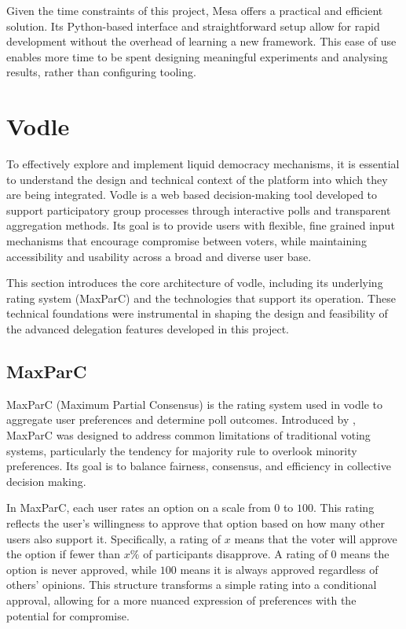 Given the time constraints of this project, Mesa offers a practical and efficient solution. Its Python-based interface and straightforward setup allow for rapid development without the overhead of learning a new framework. This ease of use enables more time to be spent designing meaningful experiments and analysing results, rather than configuring tooling.
\section{Vodle}
To effectively explore and implement liquid democracy mechanisms, it is essential to understand the design and technical context of the platform into which they are being integrated. Vodle is a web based decision-making tool developed to support participatory group processes through interactive polls and transparent aggregation methods. Its goal is to provide users with flexible, fine grained input mechanisms that encourage compromise between voters, while maintaining accessibility and usability across a broad and diverse user base.

This section introduces the core architecture of vodle, including its underlying rating system (MaxParC) and the technologies that support its operation. These technical foundations were instrumental in shaping the design and feasibility of the advanced delegation features developed in this project.


\subsection{MaxParC}\label{subsec:background_maxparc}
MaxParC (Maximum Partial Consensus) is the rating system used in vodle to aggregate user preferences and determine poll outcomes. Introduced by \citet{heitzig_fair_2024}, MaxParC was designed to address common limitations of traditional voting systems, particularly the tendency for majority rule to overlook minority preferences. Its goal is to balance fairness, consensus, and efficiency in collective decision making.

In MaxParC, each user rates an option on a scale from $0$ to $100$. This rating reflects the user's willingness to approve that option based on how many other users also support it. Specifically, a rating of $x$ means that the voter will approve the option if fewer than $x\%$ of participants disapprove. A rating of $0$ means the option is never approved, while $100$ means it is always approved regardless of others' opinions. This structure transforms a simple rating into a conditional approval, allowing for a more nuanced expression of preferences with the potential for compromise.

